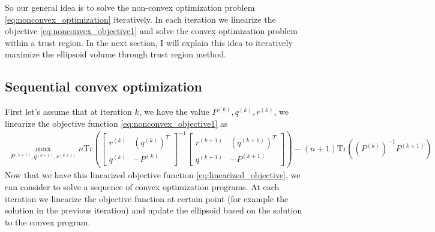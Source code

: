 \documentclass{article}
\begin{document}
So our general idea is to solve the non-convex optimization problem \eqref{eq:nonconvex_optimization} iteratively. In each iteration we linearize the objective \eqref{eq:nonconvex_objective1} and solve the convex optimization problem within a trust region. In the next section, I will explain this idea to iteratively maximize the ellipsoid volume through trust region method.

\subsection{Sequential convex optimization}
First let's assume that at iteration $k$, we have the value $P^{(k)}, q^{(k)}, r^{(k)}$, we linearize the objective function \eqref{eq:nonconvex_objective1} as
\begin{align}
	\max_{P^{(k+1)}, q^{(k+1)}, r^{(k+1)}} n\text{Tr}\left(\begin{bmatrix}r^{(k)} &(q^{(k)})^T\\q^{(k)} & -P^{(k)}\end{bmatrix}^{-1}\begin{bmatrix} r^{(k+1)} & (q^{(k+1)})^T\\q^{(k+1)} & -P^{(k+1)}\end{bmatrix}\right) - (n+1)\text{Tr}\left((P^{(k)})^{-1} P^{(k+1)}\right)
	\label{eq:linearized_objective}
\end{align}
Now that we have this linearized objective function \eqref{eq:linearized_objective}, we can consider to solve a sequence of convex optimization programs. At each iteration we linearize the objective function at certain point (for example the solution in the previous iteration) and update the ellipsoid based on the solution to the convex program.
\end{document}
